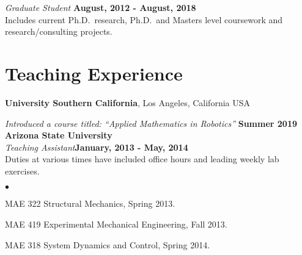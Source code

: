 \documentclass[margin,line]{res}
\newenvironment{list2}{
  \begin{list}{$\bullet$}{%
      \setlength{\itemsep}{0in}
      \setlength{\parsep}{0in} \setlength{\parskip}{0in}
      \setlength{\topsep}{0in} \setlength{\partopsep}{0in} 
      \setlength{\leftmargin}{0.2in}}}{\end{list}}
\begin{document}
\begin{resume}
\vspace{-.3cm}
{\em Graduate Student} \hfill {\bf August, 2012 - August, 2018}\\
Includes current Ph.D.~research, Ph.D.~and Masters level coursework and
research/consulting projects.






\section{\sc Teaching Experience}
{\bf University Southern California}, Los Angeles, California USA

\vspace{-.3cm}
{\em Introduced a course titled: ``Applied Mathematics in Robotics''} \hfill {\bf Summer 2019}\\

{\bf Arizona State University} \\
{\em Teaching Assistant}\hfill {\bf January, 2013  - May, 2014}\\
Duties at various times have included 
office hours and leading weekly lab exercises.
\begin{list2}
	\item MAE 322 Structural Mechanics, Spring 2013.
	\item MAE 419 Experimental Mechanical Engineering, Fall 2013.
	\item MAE 318 System Dynamics and Control, Spring 2014.
\end{list2}


\end{resume}
\end{document}
